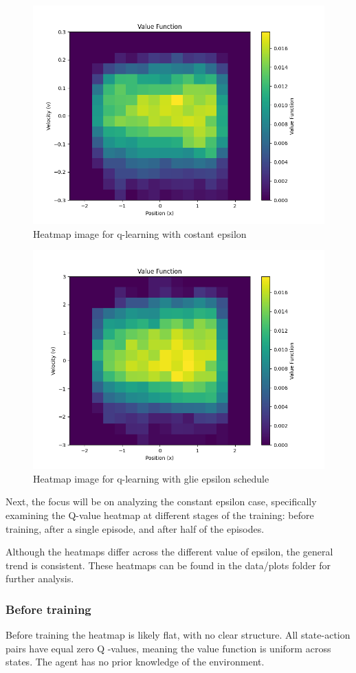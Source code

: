 \documentclass{article}
\begin{document}
\begin{figure}[h]
	\centering
	\includegraphics[width=0.5\linewidth]{../data/plot/heatmap_full_training_constant_0.2.png}
	\caption{Heatmap image for q-learning with costant epsilon}
	\label{fig:heatmap_costant_full}
\end{figure}
\begin{figure}[h]
	\centering
	\includegraphics[width=0.5\linewidth]{../data/plot/heatmap_full_training_GLIE.png}
	\caption{Heatmap image for q-learning with glie epsilon schedule}
	\label{fig:heatmap_glie_full}
\end{figure}

Next, the focus will be on analyzing the constant epsilon case, specifically examining the Q-value heatmap at different stages of the training: before training, after a single episode, and after half of the episodes.

Although the heatmaps differ across the different value of epsilon, the general trend is consistent. These heatmaps can be found in the data/plots folder for further analysis.


\subsubsection{Before training}
Before training the heatmap is likely flat, with no clear structure. All state-action pairs have equal zero Q -values, meaning  the value function is uniform across states. The agent has no prior knowledge of the environment.
\end{document}
